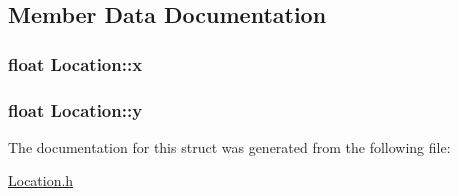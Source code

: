 \subsection{Member Data Documentation}
\hypertarget{structLocation_ac81cc1119b7ac8ac70ee635f2e3d4bb7}{
\subsubsection[{x}]{\setlength{\rightskip}{0pt plus 5cm}float Location\-::x}}\label{structLocation_ac81cc1119b7ac8ac70ee635f2e3d4bb7}
\hypertarget{structLocation_a10fbad67977d8dd3911eb629c1797684}{
\subsubsection[{y}]{\setlength{\rightskip}{0pt plus 5cm}float Location\-::y}}\label{structLocation_a10fbad67977d8dd3911eb629c1797684}


The documentation for this struct was generated from the following file\-:\begin{DoxyCompactItemize}
\item 
\hyperlink{Location_8h}{Location.\-h}\end{DoxyCompactItemize}
